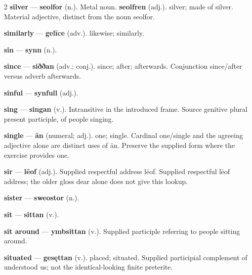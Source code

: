 \begin{multicols}{2}
\textbf{silver} — \textbf{seolfor} (n.). Metal noun. \textbf{seolfren} (adj.). silver; made of silver. Material adjective, distinct from the noun seolfor.\par
\textbf{similarly} — \textbf{gelīce} (adv.). likewise; similarly.\par
\textbf{sin} — \textbf{synn} (n.).\par
\textbf{since} — \textbf{siððan} (adv.; conj.). since; after; afterwards. Conjunction since/after versus adverb afterwards.\par
\textbf{sinful} — \textbf{synfull} (adj.).\par
\textbf{sing} — \textbf{singan} (v.). Intransitive in the introduced frame. Source genitive plural present participle, of people singing.\par
\textbf{single} — \textbf{ān} (numeral; adj.). one; single. Cardinal one/single and the agreeing adjective alone are distinct uses of ān. Preserve the supplied form where the exercise provides one.\par
\textbf{sir} — \textbf{lēof} (adj.). Supplied respectful address lēof. Supplied respectful lēof address; the older gloss dear alone does not give this lookup.\par
\textbf{sister} — \textbf{sweostor} (n.).\par
\textbf{sit} — \textbf{sittan} (v.).\par
\textbf{sit around} — \textbf{ymbsittan} (v.). Supplied participle referring to people sitting around.\par
\textbf{situated} — \textbf{gesęttan} (v.). placed; situated. Supplied participial complement of understood us; not the identical-looking finite preterite.\par

\end{multicols}
